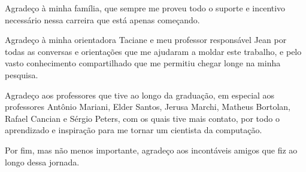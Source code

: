\begin{agradecimentos}
    Agradeço à minha família, que sempre me proveu todo o suporte e incentivo
    necessário nessa carreira que está apenas começando.

    Agradeço à minha orientadora Taciane e meu professor responsável Jean por
    todas as conversas e orientações que me ajudaram a moldar este trabalho, e
    pelo vasto conhecimento compartilhado que me permitiu chegar longe na minha
    pesquisa.

    Agradeço aos professores que tive ao longo da graduação, em especial aos
    professores Antônio Mariani, Elder Santos, Jerusa Marchi, Matheus Bortolan,
    Rafael Cancian e Sérgio Peters, com os quais tive mais contato, por todo o
    aprendizado e inspiração para me tornar um cientista da computação.

    Por fim, mas não menos importante, agradeço aos incontáveis amigos que fiz ao longo dessa jornada.
\end{agradecimentos}
